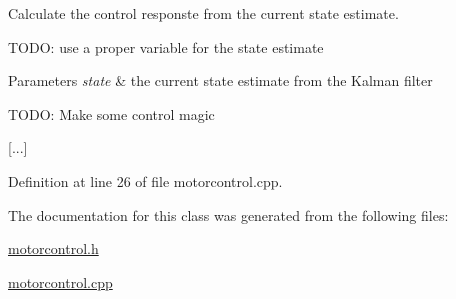 \-Calculate the control responste from the current state estimate. 

\-T\-O\-D\-O\-: use a proper variable for the state estimate


\begin{DoxyParams}{\-Parameters}
{\em state} & the current state estimate from the \-Kalman filter \\
\hline
\end{DoxyParams}
\-T\-O\-D\-O\-: \-Make some control magic

\mbox{[}...\mbox{]} 

\-Definition at line 26 of file motorcontrol.\-cpp.



\-The documentation for this class was generated from the following files\-:\begin{DoxyCompactItemize}
\item 
\hyperlink{motorcontrol_8h}{motorcontrol.\-h}\item 
\hyperlink{motorcontrol_8cpp}{motorcontrol.\-cpp}\end{DoxyCompactItemize}
